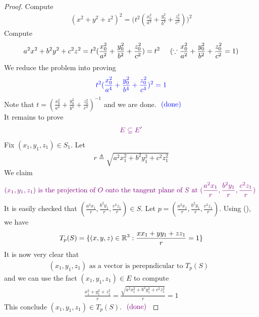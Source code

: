 \documentclass{report}
\begin{document}
\begin{proof}
Compute  
\begin{align*}
  (x^2+y^2+z^2)^2=\Big(t^2(\frac{x_0^2}{a^4}+\frac{y_0^2}{b^4}+\frac{z_0^2}{c^2}) \Big)^2
\end{align*}
Compute 
\begin{align*}
a^2x^2+b^2y^2+c^2z^2=t^2 (\frac{x_0^2}{a^2}+\frac{y_0^2}{b^2}+\frac{z_0^2}{c^2})=t^2\hspace{0.5cm}(\because \frac{x_0^2}{a^2}+\frac{y_0^2}{b^2}+\frac{z_0^2}{c^2}=1)
\end{align*}
We reduce the problem into proving
\begin{align*}
\textcolor{blue}{t^2 (\frac{x_0^2}{a^4}+\frac{y_0^2}{b^4}+\frac{z_0^2}{c^4})^2=1}
\end{align*}
Note that $t=(\frac{x_0^2}{a^4}+\frac{y_0^2}{b^4}+\frac{z_0^2}{c^4})^{-1}$ and we are done. $\textcolor{blue}{\text{ (done) }}$ \\

It remains to prove 
\begin{align*}
\textcolor{violet}{E\subseteq E'}
\end{align*}
Fix $(x_1,y_1,z_1)\in S_1$. Let
\begin{align*}
r\triangleq \sqrt{a^2x_1^2+b^2y_1^2+c^2z_1^2} 
\end{align*}
We claim 
\begin{align*}
\textcolor{violet}{(x_1,y_1,z_1)\text{ is the projection of $O$ onto the tangent plane of  $S$ at  $(\frac{a^2x_1}{r},\frac{b^2y_1}{r},\frac{c^2z_1}{r})$ }}
\end{align*}
It is easily checked that $(\frac{a^2x_1}{r},\frac{b^2y_1}{r},\frac{c^2z_1}{r})\in S$. Let $p=(\frac{a^2x_1}{r},\frac{b^2y_1}{r},\frac{c^2z_1}{r})$. Using (), we have 
\begin{align*}
T_p(S)=\{ (x,y,z)\in\mathbb{R}^3 : \frac{x x_1+y y_1+z z_1}{r}=1 \}
\end{align*}
It is now very clear that 
\begin{align*}
  (x_1,y_1,z_1)\text{ as a vector is perepndicular to $T_p(S)$ }
\end{align*}
and we can use the fact $(x_1,y_1,z_1)\in E$ to compute 
\begin{align*}
\frac{x_1^2+y_1^2+z_1^2}{r}= \frac{\sqrt{a^2x_1^2+b^2y_1^2+c^2z_1^2} }{r}=1
\end{align*}
This conclude $(x_1,y_1,z_1)\in T_p(S)$. $\textcolor{violet}{\text{ (done) }}$
\end{proof}
\end{document}
